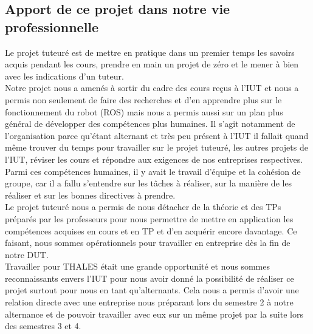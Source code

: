 \documentclass{PackagerQualityN}
\begin{document}



\newp

\subsection{Apport de ce projet dans notre vie professionnelle}

Le projet tuteuré est de mettre en pratique dans un premier temps les savoirs acquis pendant les cours, prendre en main un projet de zéro et le mener à bien avec les indications d’un tuteur.\\

Notre projet nous a amenés à sortir du cadre des cours reçus à l’IUT et nous a permis non seulement de faire des recherches et d’en apprendre plus sur le fonctionnement du robot (ROS) mais nous a permis aussi sur un plan plus général de développer des compétences plus humaines. Il s’agit notamment de l’organisation parce qu’étant alternant et très peu présent à l’IUT il fallait quand même trouver du temps pour travailler sur le projet tuteuré, les autres projets de l’IUT, réviser les cours et répondre aux exigences de nos entreprises respectives. Parmi ces compétences humaines, il y avait le travail d’équipe et la cohésion de groupe, car il a fallu s’entendre sur les tâches à réaliser, sur la manière de les réaliser et sur les bonnes directives à prendre.\\

Le projet tuteuré nous a permis de nous détacher de la théorie et des TPs préparés par les professeurs pour nous permettre de mettre en application les compétences acquises en cours et en TP et d’en acquérir encore davantage. Ce faisant, nous sommes opérationnels pour travailler en entreprise dès la fin de notre DUT.\\

Travailler pour THALES était une grande opportunité et nous sommes reconnaissants envers l’IUT pour nous avoir donné la possibilité de réaliser ce projet surtout pour nous en tant qu’alternants. Cela nous a permis d’avoir une relation directe avec une entreprise nous préparant lors du semestre 2 à notre alternance et de pouvoir travailler avec eux sur un même projet par la suite lors des semestres 3 et 4.
\end{document}
